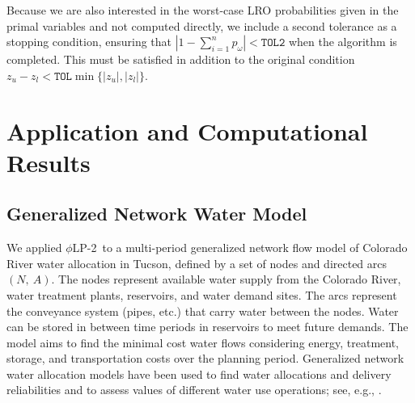 \documentclass[11pt]{article}
\newcommand{\plp}{$\phi$LP-2}
\begin{document}
Because we are also interested in the worst-case LRO probabilities given in the primal variables and not computed directly, we include a second tolerance as a stopping condition, ensuring that $\left| 1 - \sum_{i=1}^n p_\omega \right| < \texttt{TOL2}$ when the algorithm is completed.
This must be satisfied in addition to the original condition $z_u - z_l < \texttt{TOL}\min\{|z_u|,|z_l|\}$.

\section{Application and Computational Results} \label{sec:comp_results}

\subsection{Generalized Network Water Model} 
\label{ssec:network_model}

We applied \plp\ to a multi-period generalized network flow model of Colorado River water allocation in Tucson, defined by a set of nodes and directed arcs $(N,\: A)$.
The nodes represent available water supply from the Colorado River, water treatment plants, reservoirs, and water demand sites.
The arcs represent the conveyance system (pipes, etc.) that carry water between the nodes. 
Water can be stored in between time periods in reservoirs to meet future demands. 
The model aims to find the minimal cost water flows considering energy, treatment, storage, and transportation costs over the planning period. 
Generalized network water allocation models have been used to find water allocations and delivery reliabilities and to assess values of different water use operations; see, e.g., \cite{draper_etal_03}. 
\end{document}
